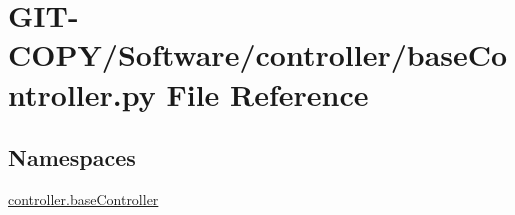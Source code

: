 \hypertarget{GIT-COPY_2Software_2controller_2baseController_8py}{}\section{G\+I\+T-\/\+C\+O\+P\+Y/\+Software/controller/base\+Controller.py File Reference}
\label{GIT-COPY_2Software_2controller_2baseController_8py}
\subsection*{Namespaces}
\begin{DoxyCompactItemize}
\item 
 \hyperlink{namespacecontroller_1_1baseController}{controller.\+base\+Controller}
\end{DoxyCompactItemize}
